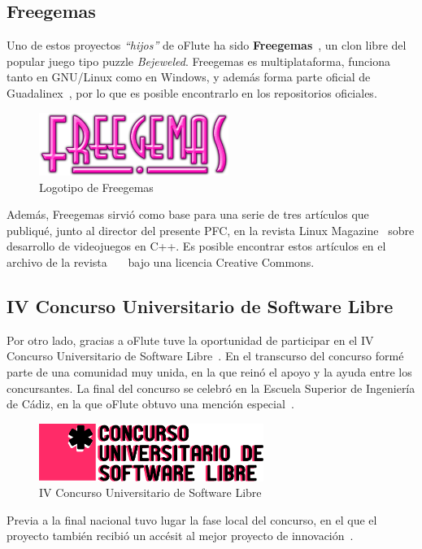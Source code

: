 \subsection{Freegemas}

Uno de estos proyectos \textit{``hijos''} de oFlute ha sido
\textbf{Freegemas}~\cite{freegemas}, un clon libre del popular juego tipo puzzle
\textit{Bejeweled}. Freegemas es multiplataforma, funciona tanto en GNU/Linux
como en Windows, y además forma parte oficial de Guadalinex~\cite{guadalinex},
por lo que es posible encontrarlo en los repositorios oficiales.

\begin{figure}[h!]
  \centering
  \includegraphics[width=0.55\textwidth]{8_conclusiones/imagen_freegemas}
  \caption{Logotipo de Freegemas}
\end{figure}

Además, Freegemas sirvió como base para una serie de tres artículos que
publiqué, junto al director del presente PFC, en la revista Linux
Magazine~\cite{linuxmagazine} sobre desarrollo de videojuegos en C++. Es posible
encontrar estos artículos en el archivo de la
revista~\cite{refarticulo1}~\cite{refarticulo2}~\cite{refarticulo3} bajo una
licencia Creative Commons.

\subsection{IV Concurso Universitario de Software Libre}

Por otro lado, gracias a oFlute tuve la oportunidad de participar en el IV
Concurso Universitario de Software Libre~\cite{cusl}. En el transcurso del
concurso formé parte de una comunidad muy unida, en la que reinó el apoyo y la
ayuda entre los concursantes. La final del concurso se celebró en la Escuela
Superior de Ingeniería de Cádiz, en la que oFlute obtuvo una mención
especial~\cite{cusl2}.

\begin{figure}[h!]
  \centering
  \includegraphics[width=0.65\textwidth]{8_conclusiones/imagen_logocusl}
  \caption{IV Concurso Universitario de Software Libre}
\end{figure}

Previa a la final nacional tuvo lugar la fase local del concurso, en el que el
proyecto también recibió un accésit al mejor proyecto de
innovación~\cite{cusllocal}.

